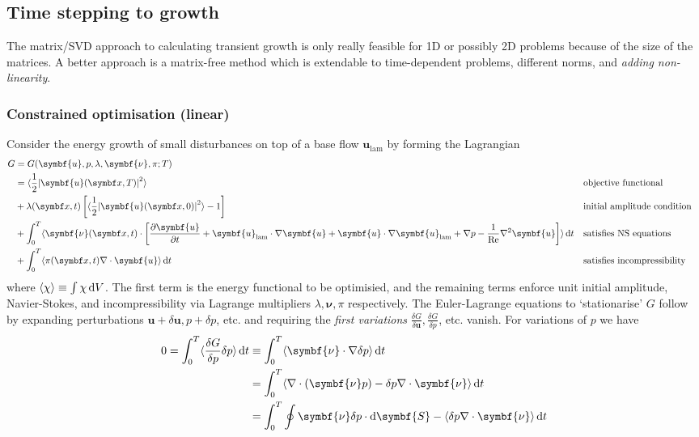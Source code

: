 \documentclass{jknotes}
\renewcommand{\u}{\symbf{u}}
\newcommand{\ReN}{\text{Re}}
\begin{document}
\subsection{Time stepping to growth}
The matrix/SVD approach to calculating transient growth is only really
feasible for 1D or possibly 2D problems because of the size of the matrices. A
better approach is a matrix-free method which is extendable to time-dependent
problems, different norms, and \emph{adding non-linearity}.

\subsubsection{Constrained optimisation (linear)}
Consider the energy growth of small disturbances on top of a base flow
$\u_{\text{lam}}$ by forming the Lagrangian
\begin{align}
	G &= G(\u, p, \lambda, \symbf{\nu}, \pi; T) \\
	  &= \langle \frac{1}{2} \abs{\u(\x, T)}^2\rangle &&\text{objective
	  functional}\\
	  &+ \lambda(\x,t) \left[ \langle \frac{1}{2}\abs{\u(\x,0)}^2\rangle -1 \right]
	  &&\text{initial amplitude condition} \\
	  &+ \int_0^T \langle \symbf{\nu}(\x,t) \cdot \left[ \frac{\partial
	  \u}{\partial t} + \u_{\text{lam}} \cdot \nabla \u + \u \cdot \nabla
	  \u_{\text{lam}} + \nabla p - \frac{1}{\ReN} \nabla^2 \u \right] \rangle
	\, \diffd t &&\text{satisfies NS equations} \\
				&+ \int_0^T \langle \pi(\x,t) \nabla \cdot \u \rangle \,
	\diffd t &&\text{satisfies incompressibility}
\end{align}
where $\langle \chi \rangle \equiv \int \chi \, \diffd V$. The first term is
the energy functional to be optimisied, and the remaining terms enforce unit
initial amplitude, Navier-Stokes, and incompressibility via Lagrange
multipliers $\lambda, \symbf{\nu}, \pi$ respectively. The Euler-Lagrange
equations to `stationarise' $G$ follow by expanding perturbations $\u
+\delta\u, p + \delta p$, etc. and requiring the \emph{first variations}
$\frac{\delta G}{\delta \u}, \frac{\delta G}{\delta p}$, etc. vanish. For
variations of $p$ we have
\begin{align}
	0 = \int_0^T \langle \frac{\delta G}{\delta p} \delta p \rangle \, \diffd
	t  &\equiv \int_0^T \langle \symbf{\nu}\cdot\nabla \delta p\rangle \,
	\diffd t \\
	   &= \int_0^T \langle \nabla \cdot (\symbf{\nu} p) - \delta p \nabla
	   \cdot \symbf{\nu} \rangle \, \diffd t \\
	   &= \int_0^T \oint \symbf{\nu} \delta p \cdot \diffd \symbf{S} - \langle
	   \delta p \nabla \cdot \symbf{\nu} \rangle \, \diffd t
\end{align}
\end{document}
